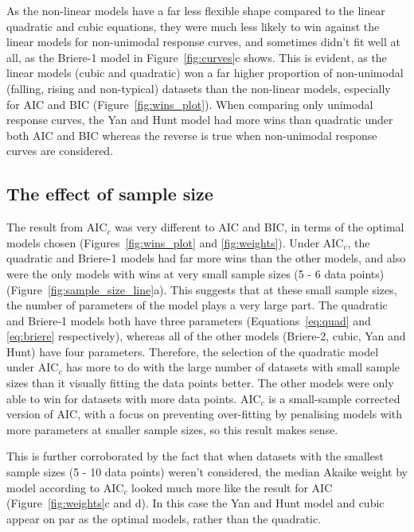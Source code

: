 \documentclass[11pt, a4paper]{article}
\begin{document}
As the non-linear models have a far less flexible shape compared to the linear quadratic and cubic equations, they were much less likely to win against the linear models for non-unimodal response curves, and sometimes didn't fit well at all, as the Briere-1 model in Figure~\ref{fig:curves}c shows. This is evident, as the linear models (cubic and quadratic) won a far higher proportion of non-unimodal (falling, rising and non-typical) datasets than the non-linear models, especially for AIC and BIC (Figure~\ref{fig:wins_plot}). When comparing only unimodal response curves, the Yan and Hunt model had more wins than quadratic under both AIC and BIC whereas the reverse is true when non-unimodal response curves are considered.


\subsection{The effect of sample size}
The result from AIC$_c$ was very different to AIC and BIC, in terms of the optimal models chosen (Figures~\ref{fig:wins_plot} and \ref{fig:weights}). Under AIC$_c$, the quadratic and Briere-1 models had far more wins than the other models, and also were the only models with wins at very small sample sizes (5 - 6 data points) (Figure~\ref{fig:sample_size_line}a). This suggests that at these small sample sizes, the number of parameters of the model plays a very large part. The quadratic and Briere-1 models both have three parameters (Equations~\ref{eq:quad} and \ref{eq:briere} respectively), whereas all of the other models (Briere-2, cubic, Yan and Hunt) have four parameters. Therefore, the selection of the quadratic model under AIC$_c$ has more to do with the large number of datasets with small sample sizes than it visually fitting the data points better. The other models were only able to win for datasets with more data points. AIC$_c$ is a small-sample corrected version of AIC, with a focus on preventing over-fitting by penalising models with more parameters at smaller sample sizes, so this result makes sense.

This is further corroborated by the fact that when datasets with the smallest sample sizes (5 - 10 data points) weren't considered, the median Akaike weight by model according to AIC$_c$ looked much more like the result for AIC (Figure~\ref{fig:weights}c and d). In this case the Yan and Hunt model and cubic appear on par as the optimal models, rather than the quadratic. 
\end{document}
